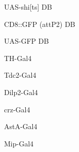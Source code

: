 \documentclass[17pt]{extarticle}
\begin{document}
\newpage{}
\vspace*{\fill}\begin{normalsize}
UAS-shi[ts] DB \\[0.5em]
\end{normalsize}
\footnotesize
\vspace*{\fill}
\newpage{}
\vspace*{\fill}\begin{small}
CD8::GFP (attP2) DB \\[0.5em]
\end{small}
\footnotesize
\vspace*{\fill}
\newpage{}
\vspace*{\fill}\begin{large}
UAS-GFP DB \\[0.5em]
\end{large}
\footnotesize
\vspace*{\fill}
\newpage{}
\vspace*{\fill}\begin{large}
TH-Gal4 \\[0.5em]
\end{large}
\footnotesize
\vspace*{\fill}
\newpage{}
\vspace*{\fill}\begin{large}
Tdc2-Gal4 \\[0.5em]
\end{large}
\footnotesize
\vspace*{\fill}
\newpage{}
\vspace*{\fill}\begin{large}
Dilp2-Gal4 \\[0.5em]
\end{large}
\footnotesize
\vspace*{\fill}
\newpage{}
\vspace*{\fill}\begin{large}
crz-Gal4 \\[0.5em]
\end{large}
\footnotesize
\vspace*{\fill}
\newpage{}
\vspace*{\fill}\begin{large}
AstA-Gal4 \\[0.5em]
\end{large}
\footnotesize
\vspace*{\fill}
\newpage{}
\vspace*{\fill}\begin{large}
Mip-Gal4 \\[0.5em]
\end{large}
\end{document}
